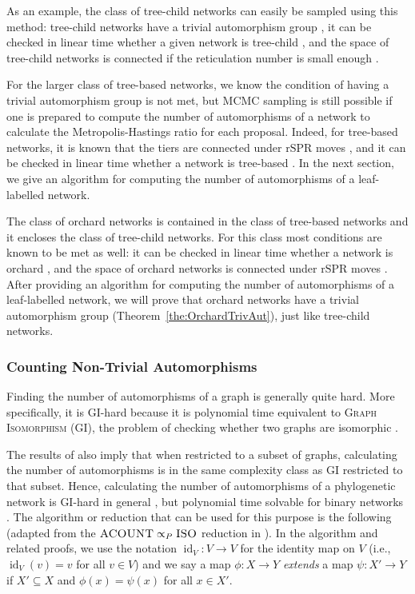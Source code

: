\documentclass{article}
\theoremstyle{definition}
\DeclareMathOperator{\id}{id}
\newcommand{\rSPR}{\mathrm{rSPR}}
\begin{document}
As an example, the class of tree-child networks can easily be sampled using this method: tree-child networks have a trivial automorphism group \cite{mcdiarmid2015counting,Klawitter2018SNPRneigh}, it can be checked in linear time whether a given network is tree-child \cite[e.g.]{huber2024orienting}, and the space of tree-child networks is connected if the reticulation number is small enough \cite{bordewich2017lost,klawitter2020spaces}. 

For the larger class of tree-based networks, we know the condition of having a trivial automorphism group is not met, but MCMC sampling is still possible if one is prepared to compute the number of automorphisms of a network to calculate the Metropolis-Hastings ratio for each proposal. Indeed, for tree-based networks, it is known that the tiers are connected under $\rSPR$ moves \cite{ERDOS2021205}, and it can be checked in linear time whether a network is tree-based \cite{zhang2016tree, hayamizu2021structure}. In the next section, we give an algorithm for computing the number of automorphisms of a leaf-labelled network.

The class of orchard networks is contained in the class of tree-based networks and it encloses the class of tree-child networks. For this class most conditions are known to be met as well: it can be checked in linear time whether a network is orchard \cite{erdHos2019class,janssen2021cherry}, and the space of orchard networks is connected under $\rSPR$ moves \cite{van2022orchard}. After providing an algorithm for computing the number of automorphisms of a leaf-labelled network, we will prove that orchard networks have a trivial automorphism group (Theorem~\ref{the:OrchardTrivAut}), just like tree-child networks. 

\subsubsection{Counting Non-Trivial Automorphisms}\label{sec:counting_automorphisms}
Finding the number of automorphisms of a graph is generally quite hard. More specifically, it is GI-hard because it is polynomial time equivalent to \textsc{Graph Isomorphism} (GI), the problem of checking whether two graphs are isomorphic \cite{mathon1979note,beals1999finding}.

The results of \cite{mathon1979note,beals1999finding} also imply that when restricted to a subset of graphs, calculating the number of automorphisms is in the same complexity class as GI restricted to that subset. Hence, calculating the number of automorphisms of a phylogenetic network is GI-hard in general \cite{cardona2014comparison}, but polynomial time solvable for binary networks \cite{luks1982isomorphism,kobler2012graph,mena2012ternary}. The algorithm or reduction that can be used for this purpose is the following (adapted from the $\textsc{ACOUNT} \propto_P \textsc{ISO}$ reduction in \cite{mathon1979note}). In the algorithm and related proofs, we use the notation $\id_V:V\to V$ for the identity map on $V$ (i.e., $\id_V(v)=v$ for all $v\in V$) and we say a map $\phi:X\to Y$ \textit{extends} a map $\psi: X' \to Y$ if $X'\subseteq X$ and $\phi(x)=\psi(x)$ for all $x\in X'$.
\end{document}

